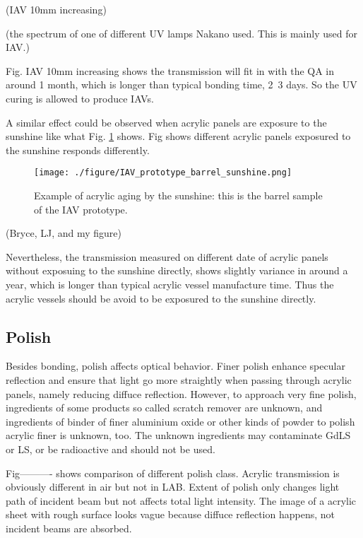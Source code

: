 (IAV 10mm increasing)


(the spectrum of one of different UV lamps Nakano used. This is mainly used for IAV.)


Fig. IAV 10mm increasing shows the transmission will fit in with the QA in around 1 month, which is longer than typical
bonding time, 2~3 days. So the UV curing is allowed to produce IAVs.

A similar effect could be observed when acrylic panels are exposure to the sunshine like what
Fig. \ref{IAVPrototypeBarrelSunshineAging} shows. Fig shows different
acrylic panels exposured to the sunshine responds differently.


\begin{figure}
    \centering
    \texttt{[image: ./figure/IAV\_prototype\_barrel\_sunshine.png]}
    \caption{Example of acrylic aging by the sunshine: this is the barrel sample of the IAV prototype.}
    \label{IAVPrototypeBarrelSunshineAging}
    \end{figure}

(Bryce, LJ, and my figure)


Nevertheless, the transmission measured on different date of acrylic panels without exposuing to the sunshine directly,
shows slightly variance in around a year, which is longer than typical acrylic vessel manufacture time.
Thus the acrylic vessels should be avoid to be exposured to the sunshine directly.


\subsection {Polish}

Besides bonding, polish affects optical behavior.
Finer polish enhance specular reflection and ensure that light
go more straightly when passing through acrylic panels, namely
reducing diffuce reflection. However, to approach very fine polish,
ingredients of some products so called scratch remover are unknown, and
ingredients of binder of finer aluminium oxide or other kinds of powder to polish
acrylic finer is unknown, too. The unknown ingredients may contaminate GdLS or LS, or
be radioactive and should not be used.

Fig----------  shows comparison of different
polish class. Acrylic transmission is obviously different in air but not in LAB.
Extent of polish only changes light path of incident beam but not affects total light intensity.
The image of a acrylic sheet with rough surface looks vague because diffuce reflection happens, not
incident beams are absorbed.



